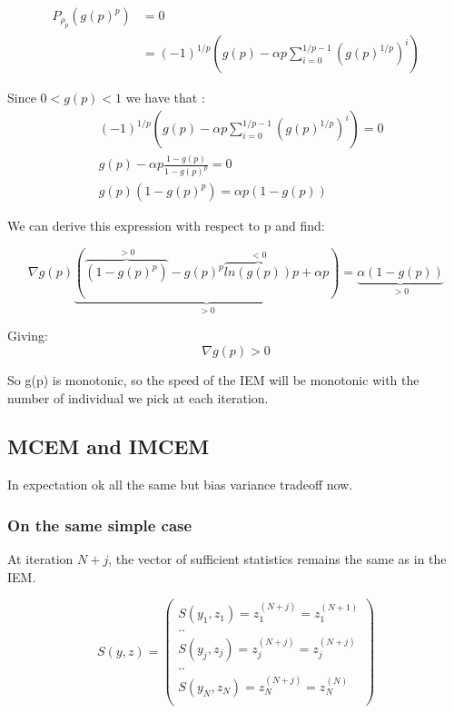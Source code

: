 \documentclass[a4paper]{article}
\theoremstyle{plain}
\theoremstyle{plain}
\theoremstyle{definition}
\begin{document}
\begin{equation}
\begin{split}
P_{\rho_p}(g(p)^p) & = 0\\
& = (-1)^{1/p}(g(p) - \alpha p \sum_{i=0}^{1/p-1}{(g(p)^{1/p})^i})
\end{split}
\end{equation}

Since $0 < g(p) < 1$ we have that :
\begin{equation}
\begin{split}
& (-1)^{1/p}(g(p) - \alpha p \sum_{i=0}^{1/p-1}{(g(p)^{1/p})^i}) = 0\\
& g(p) - \alpha p \frac{1 - g(p)}{1 - g(p)^p} = 0\\
& g(p)(1 - g(p)^p) = \alpha p (1 - g(p))
\end{split}
\end{equation}

We can derive this expression with respect to p and find:

\begin{equation}
\nabla g(p) \underbrace{(\overbrace{(1 - g(p)^p)}^{>0}- g(p)^p \overbrace{ln(g(p))}^{<0}p + \alpha p)}_{>0} = \underbrace{\alpha (1-g(p))}_{>0}
\end{equation}

Giving: 
\begin{equation}
\nabla g(p) > 0
\end{equation}

So g(p) is monotonic, so the speed of the IEM will be monotonic with the number of individual we pick at each iteration.


\subsection{MCEM and IMCEM}
In expectation ok all the same but bias variance tradeoff now.


\subsubsection{On the same simple case}
At iteration $N+j$, the vector of sufficient statistics remains the same as in the IEM.

\begin{equation}
S(y,z) = 
\left(
\begin{array}{c}
S(y_1,z_1) =z_1^{(N+j)}= z_1^{(N+1)}\\
..\\
S(y_j,z_j) =z_j^{(N+j)}= z_j^{(N+j)}\\
..\\
S(y_N,z_N) =z_N^{(N+j)}= z_N^{(N)}\\
\end{array}
\right)
\end{equation}
\end{document}
